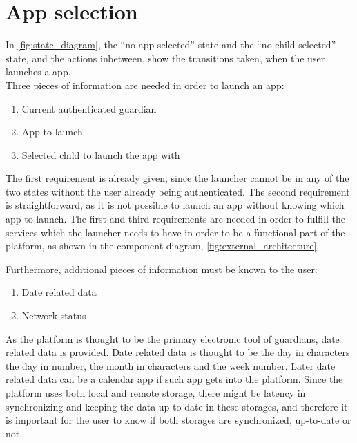 \section{App selection}
\label{sec:app_management}

\label{sec:appman_requirements}

In \autoref{fig:state_diagram}, the ``no app selected''-state and the ``no child selected''-state, and the actions inbetween, show the transitions taken, when the user launches a \giraf[] app. \\


\noindent Three pieces of information are needed in order to launch an app:

\begin{enumerate}
	\item Current authenticated guardian
	\item App to launch
	\item Selected child to launch the app with
\end{enumerate}

The first requirement is already given, since the launcher cannot be in any of the two states without the user already being authenticated.
The second requirement is straightforward, as it is not possible to launch an app without knowing which app to launch.
The first and third requirements are needed in order to fulfill the services which the launcher needs to have in order to be a functional part of the \giraf[] platform, as shown in the component diagram, \autoref{fig:external_architecture}.

Furthermore, additional pieces of information must be known to the user:

\begin{enumerate}
	\item Date related data
	\item Network status 
\end{enumerate}

As the \giraf[] platform is thought to be the primary electronic tool of guardians, date related data is provided. Date related data is thought to be the day in characters the day in number, the month in characters and the week number. Later date related data can be a calendar app if such app gets into the \giraf[] platform.
Since the \giraf[] platform uses both local and remote storage, there might be latency in synchronizing and keeping the data up-to-date in these storages, and therefore it is important for the user to know if both storages are synchronized, up-to-date or not.

